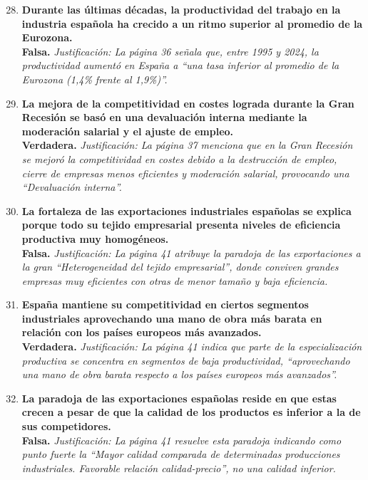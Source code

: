 \begin{enumerate}[label=\textbf{\arabic*.}]
    \setcounter{enumi}{27}

    \item \textbf{Durante las últimas décadas, la productividad del trabajo en la industria española ha crecido a un ritmo superior al promedio de la Eurozona.} \\
    \textbf{Falsa.} \textit{Justificación: La página 36 señala que, entre 1995 y 2024, la productividad aumentó en España a ``una tasa inferior al promedio de la Eurozona (1,4\% frente al 1,9\%)''.}

    \item \textbf{La mejora de la competitividad en costes lograda durante la Gran Recesión se basó en una devaluación interna mediante la moderación salarial y el ajuste de empleo.} \\
    \textbf{Verdadera.} \textit{Justificación: La página 37 menciona que en la Gran Recesión se mejoró la competitividad en costes debido a la destrucción de empleo, cierre de empresas menos eficientes y moderación salarial, provocando una ``Devaluación interna''.}

    \item \textbf{La fortaleza de las exportaciones industriales españolas se explica porque todo su tejido empresarial presenta niveles de eficiencia productiva muy homogéneos.} \\
    \textbf{Falsa.} \textit{Justificación: La página 41 atribuye la paradoja de las exportaciones a la gran ``Heterogeneidad del tejido empresarial'', donde conviven grandes empresas muy eficientes con otras de menor tamaño y baja eficiencia.}

    \item \textbf{España mantiene su competitividad en ciertos segmentos industriales aprovechando una mano de obra más barata en relación con los países europeos más avanzados.} \\
    \textbf{Verdadera.} \textit{Justificación: La página 41 indica que parte de la especialización productiva se concentra en segmentos de baja productividad, ``aprovechando una mano de obra barata respecto a los países europeos más avanzados''.}

    \item \textbf{La paradoja de las exportaciones españolas reside en que estas crecen a pesar de que la calidad de los productos es inferior a la de sus competidores.} \\
    \textbf{Falsa.} \textit{Justificación: La página 41 resuelve esta paradoja indicando como punto fuerte la ``Mayor calidad comparada de determinadas producciones industriales. Favorable relación calidad-precio'', no una calidad inferior.}

\end{enumerate}

